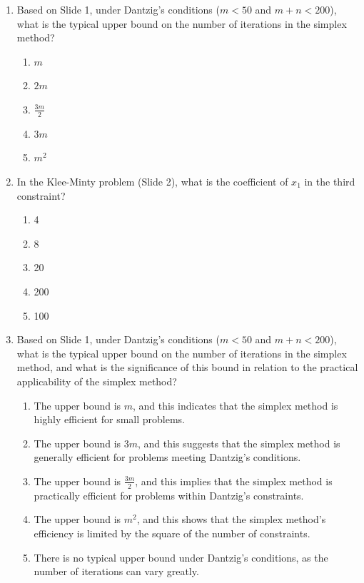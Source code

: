 \documentclass{article}%
\begin{document}
\begin{enumerate}
\begin{enumerate}
\item The number of units of a particular food in the diet.%
\end{enumerate}%
\vspace{1em}%
\item Based on Slide 1, under Dantzig's conditions ($m < 50$ and $m + n < 200$), what is the typical upper bound on the number of iterations in the simplex method?%
\begin{enumerate}%
\item $m$%
\item $2m$%
\item $\frac{3m}{2}$%
\item $3m$%
\item $m^2$%
\end{enumerate}%
\vspace{1em}%
\item In the Klee-Minty problem (Slide 2), what is the coefficient of $x_1$ in the third constraint?%
\begin{enumerate}%
\item 4%
\item 8%
\item 20%
\item 200%
\item 100%
\end{enumerate}%
\vspace{1em}%
\item Based on Slide 1, under Dantzig's conditions ($m < 50$ and $m + n < 200$), what is the typical upper bound on the number of iterations in the simplex method, and what is the significance of this bound in relation to the practical applicability of the simplex method?%
\begin{enumerate}%
\item The upper bound is $m$, and this indicates that the simplex method is highly efficient for small problems.%
\item The upper bound is $3m$, and this suggests that the simplex method is generally efficient for problems meeting Dantzig's conditions.%
\item The upper bound is $\frac{3m}{2}$, and this implies that the simplex method is practically efficient for problems within Dantzig's constraints.%
\item The upper bound is $m^2$, and this shows that the simplex method's efficiency is limited by the square of the number of constraints.%
\item There is no typical upper bound under Dantzig's conditions, as the number of iterations can vary greatly.%

\end{enumerate}
\end{enumerate}
\end{document}
